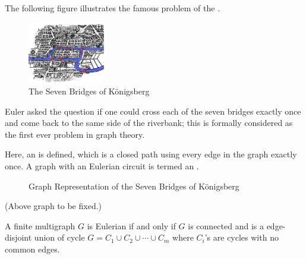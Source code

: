 The following figure illustrates the famous problem of the .

\begin{figure}[h]
    \centering
    \includegraphics[width=0.3\textwidth]{chapters/konigsberg.jpg}
    \caption{The Seven Bridges of K\"onigsberg}
    \label{fig:konigsberg}
\end{figure}

Euler asked the question if one could cross each of the seven bridges exactly once and come back to the same side of the riverbank; this is formally considered as the first ever problem in graph theory.

Here, an  is defined, which is a closed path using every edge in the graph exactly once. A graph with an Eulerian circuit is termed an .

\begin{figure}[h]
    \centering
    \caption{Graph Representation of the Seven Bridges of K\"onigsberg}
    \label{fig:konigsberg_graph}
\end{figure}
(Above graph to be fixed.)

\begin{theorem}
    A finite multigraph $G$ is Eulerian if and only if $G$ is connected and is a edge-disjoint union of cycle $G = C_{1} \cup C_{2} \cup \cdots \cup C_{m}$ where $C_{i}$'s are cycles with no common edges.
\end{theorem}

